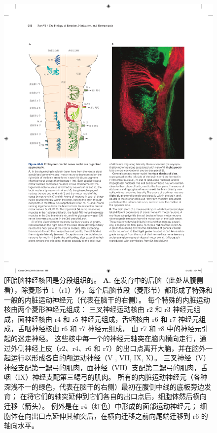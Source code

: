 \begin{figure}[htbp]
	\centering
	\includegraphics[width=1.0\linewidth]{chap40/fig_40_5}
	\caption{胚胎脑神经核团是分段组织的。
		\textbf{A.} 在发育中的后脑（此处从腹侧看），除菱形节 1（r1）外，每个后脑节段（菱形节）都形成了特殊和一般的内脏运动神经元（代表在脑干的右侧）。
		每个特殊的内脏运动核由两个菱形神经元组成：
		三叉神经运动核由 r2 和 r3 神经元组成，面神经核由 r4 和 r5 神经元组成，舌咽核由 r6 和 r7 神经元组成，舌咽神经核由 r6 和 r7 神经元组成， 由 r7 和 r8 中的神经元引起的迷走神经。
		这些核中每一个的神经元轴突在脑内横向走行，通过外侧神经上皮（r2、r4、r6 和 r7）的出口点离开大脑，并在脑外一起运行以形成各自的颅运动神经（V , VII, IX, X）。
		三叉神经（V）神经支配第一鳃弓的肌肉，面神经（VII）支配第二鳃弓的肌肉，舌咽（IX）神经支配第三鳃弓的肌肉。
		所有的内脏运动神经元（各种深浅不一的绿色，代表在脑干的右侧）最初在腹侧中线的底板旁边发育； 
		在将它们的轴突延伸到它们各自的出口点后，细胞体然后横向迁移（箭头）。
		例外是在 r4（红色）中形成的面部运动神经元；
		细胞体在向出口点延伸其轴突后，在横向迁移之前向尾端迁移到 r6 的轴向水平。
}
\end{figure}
